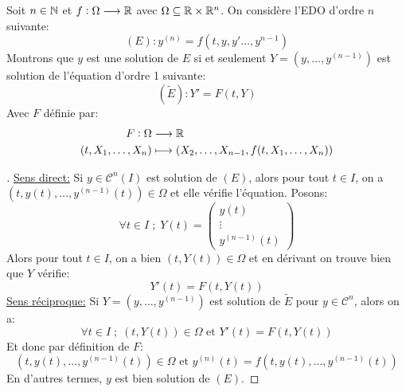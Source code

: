 \documentclass{report}
\begin{document}
   \chapter*{}
      Soit \( n \in \mathbb{N}\) et \( f : \Omega \longrightarrow \mathbb{R} \) avec \( \Omega \subseteq \mathbb{R} \times \mathbb{R}^n \). On considère l'EDO d'ordre \( n \) suivante:
      \[ 
         (E) : y^{(n)} = f(t, y, y' \ldots, y^{n-1}) 
      \]
      Montrons que \( y \) est une solution de \( E \) si et seulement \( Y = (y, \ldots, y^{(n-1)})\) est solution de l'équation d'ordre 1 suivante:
      \[ 
         (\widetilde{E}) : Y' = F(t, Y) 
      \]
      Avec \(F\) définie par:
      \[ 
         \begin{aligned}
            F : \Omega &\longrightarrow \mathbb{R} \\
            (t, X_1, \ldots, X_n) &\longmapsto (X_2, \ldots, X_{n-1}, f(t, X_1, \ldots, X_n))
         \end{aligned} 
      \]
      \begin{proof}[\unskip\nopunct]
         \uline{Sens direct:} Si \( y \in \mathcal{C}^n(I)\) est solution de \( (E) \),  alors pour tout \( t \in I \), on a \( (t, y(t), \ldots, y^{(n-1)}(t)) \in \Omega \) et elle vérifie l'équation. Posons:
         \[ 
            \forall t \in I \; ; \; Y(t) = \begin{pmatrix}
            y(t)\\
            \vdots\\
            y^{(n-1)}(t)
            \end{pmatrix}
         \]
         Alors pour tout \( t \in I \), on a bien \( (t, Y(t)) \in \Omega \) et en dérivant on trouve bien que \( Y \) vérifie:
         \[ 
            Y'(t) = F(t, Y(t))
         \] 
         \uline{Sens réciproque:} Si \( Y = (y, \ldots, y^{(n-1)})\) est solution de \(\widetilde{E} \) pour \( y \in \mathcal{C}^n \), alors on a:
         \[ 
            \forall t \in I \; ; \; (t, Y(t)) \in \Omega \text{ et } Y'(t) = F(t, Y(t)) 
         \]
         Et donc par définition de \( F \):
         \[ 
            (t, y(t), \ldots, y^{(n-1)}(t)) \in \Omega \text{ et } y^{(n)}(t) = f(t, y(t), \ldots, y^{(n-1)}(t)) 
         \]
         En d'autres termes, \( y \) est bien solution de \( (E) \).
      \end{proof}
\end{document}
